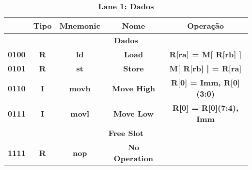 \documentclass{article}
\begin{document}
    \begin{table}[H]
      \centering
      \captionsetup{labelformat=empty, skip=0pt}
      \caption{\textbf{Lane 1: Dados}}
      \begin{tabular}{|c|*{4}{c|}}
        \hline
        \rowcolor{gray!50}
        \multicolumn{1}{|c|}{\textbf{Opcode}} & \multicolumn{1}{|c|}{\textbf{Tipo}} & \multicolumn{1}{|c|}{\textbf{Mnemonic}} & \multicolumn{1}{|c|}{\textbf{Nome}}                    & \multicolumn{1}{|c|}{\textbf{Operação}}  \\ \hline
        \multicolumn{5}{|c|}{\textbf{Dados}} \\ \hline 
        \multicolumn{1}{|c|}{\textbf{0100}}    & \multicolumn{1}{c|}{\textbf{R}}    & \multicolumn{1}{c|}{\textbf{ld}}      & \multicolumn{1}{c|}{\textbf{Load}}           & \multicolumn{1}{c|}{\textbf{R[ra] = M[ R[rb] ]}}  \\ \hline
        \multicolumn{1}{|c|}{\textbf{0101}}    & \multicolumn{1}{c|}{\textbf{R}}    & \multicolumn{1}{c|}{\textbf{st}}     & \multicolumn{1}{c|}{\textbf{Store}}             & \multicolumn{1}{c|}{\textbf{M[ R[rb] ] = R[ra]}}  \\ \hline
        \multicolumn{1}{|c|}{\textbf{0110}}    & \multicolumn{1}{c|}{\textbf{I}}    & \multicolumn{1}{c|}{\textbf{movh}}      & \multicolumn{1}{c|}{\textbf{Move High}}              & \multicolumn{1}{c|}{\textbf{R[0] = {Imm, R[0](3:0)}}}  \\ \hline
        \multicolumn{1}{|c|}{\textbf{0111}}    & \multicolumn{1}{c|}{\textbf{I}}    & \multicolumn{1}{c|}{\textbf{movl}}       & \multicolumn{1}{c|}{\textbf{Move Low}}               & \multicolumn{1}{c|}{\textbf{R[0] = {R[0](7:4), Imm}}}  \\ \hline
        \multicolumn{5}{|c|}{\textbf{Free Slot}} \\ \hline 
        \multicolumn{1}{|c|}{\textbf{1111}}    & \multicolumn{1}{c|}{\textbf{R}}    & \multicolumn{1}{c|}{\textbf{nop}}       & \multicolumn{1}{c|}{\textbf{No Operation}}   & \multicolumn{1}{c|}{\textbf{}}  \\ \hline
      \end{tabular}
    \end{table}
\end{document}
